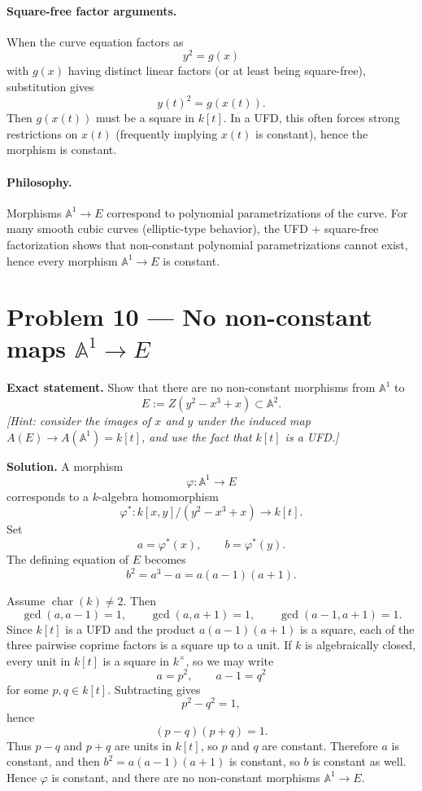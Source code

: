 \documentclass[12pt,a4paper]{article}
\theoremstyle{plain}
\theoremstyle{definition}      %
\begin{document}
\paragraph{Square-free factor arguments.}
When the curve equation factors as
\[
y^2 = g(x)
\]
with $g(x)$ having distinct linear factors (or at least being square-free), substitution gives
\[
y(t)^2 = g(x(t)).
\]
Then $g(x(t))$ must be a square in $k[t]$.
In a UFD, this often forces strong restrictions on $x(t)$ (frequently implying $x(t)$ is constant), hence the morphism is constant.

\paragraph{Philosophy.}
Morphisms $\mathbb{A}^1\to E$ correspond to polynomial parametrizations of the curve.
For many smooth cubic curves (elliptic-type behavior), the UFD + square-free factorization shows that non-constant polynomial parametrizations cannot exist, hence every morphism $\mathbb{A}^1\to E$ is constant.

\section*{Problem 10 — No non-constant maps $\mathbb A^1\to E$}

\textbf{Exact statement.}
Show that there are no non-constant morphisms from $\mathbb A^1$ to
\[
E
:=
Z(y^2-x^3+x)
\subset
\mathbb A^2.
\]
\emph{[Hint: consider the images of $x$ and $y$ under the induced map
	$A(E)\to A(\mathbb A^1)=k[t]$, and use the fact that $k[t]$ is a UFD.]}

\textbf{Solution.}
A morphism
\[
\varphi:\mathbb A^1\to E
\]
corresponds to a $k$-algebra homomorphism
\[
\varphi^*:
k[x,y]/(y^2-x^3+x)
\to
k[t].
\]
Set
\[
a
=
\varphi^*(x),
\qquad
b
=
\varphi^*(y).
\]
The defining equation of $E$ becomes
\[
b^2
=
a^3-a
=
a(a-1)(a+1).
\]

Assume $\operatorname{char}(k)\neq 2$.
Then
\[
\gcd(a,a-1)=1,
\qquad
\gcd(a,a+1)=1,
\qquad
\gcd(a-1,a+1)=1.
\]
Since $k[t]$ is a UFD and the product $a(a-1)(a+1)$ is a square, each of the three pairwise coprime factors
is a square up to a unit.
If $k$ is algebraically closed, every unit in $k[t]$ is a square in $k^\times$,
so we may write
\[
a
=
p^2,
\qquad
a-1
=
q^2
\]
for some $p,q\in k[t]$.
Subtracting gives
\[
p^2-q^2
=
1,
\]
hence
\[
(p-q)(p+q)
=
1.
\]
Thus $p-q$ and $p+q$ are units in $k[t]$, so $p$ and $q$ are constant.
Therefore $a$ is constant, and then $b^2=a(a-1)(a+1)$ is constant, so $b$ is constant as well.
Hence $\varphi$ is constant, and there are no non-constant morphisms $\mathbb A^1\to E$.
\end{document}
